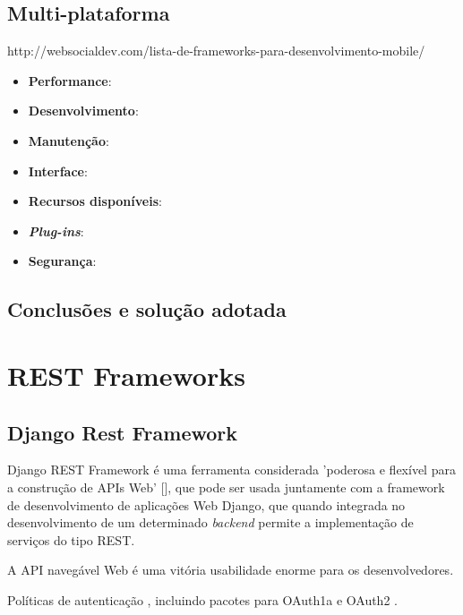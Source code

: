 \subsection{Multi-plataforma}

http://websocialdev.com/lista-de-frameworks-para-desenvolvimento-mobile/


\begin{itemize}
	\item \textbf{Performance}: 
	\item \textbf{Desenvolvimento}: 
	\item \textbf{Manutenção}: 
	\item \textbf{Interface}: 
	\item \textbf{Recursos disponíveis}: 
	\item \textbf{\textit{Plug-ins}}: 
	\item \textbf{Segurança}: 
\end{itemize}




\subsection{Conclusões e solução adotada}





\newpage
\section{REST Frameworks}




\subsection{Django Rest Framework}





Django REST Framework é uma ferramenta considerada 'poderosa e flexível para a construção de APIs Web' [], que pode ser usada juntamente com a framework de desenvolvimento de aplicações Web Django, que quando integrada no desenvolvimento de um determinado \textit{backend} permite a implementação de serviços do tipo REST.



A API navegável Web é uma vitória usabilidade enorme para os desenvolvedores.

Políticas de autenticação , incluindo pacotes para OAuth1a e OAuth2 .

